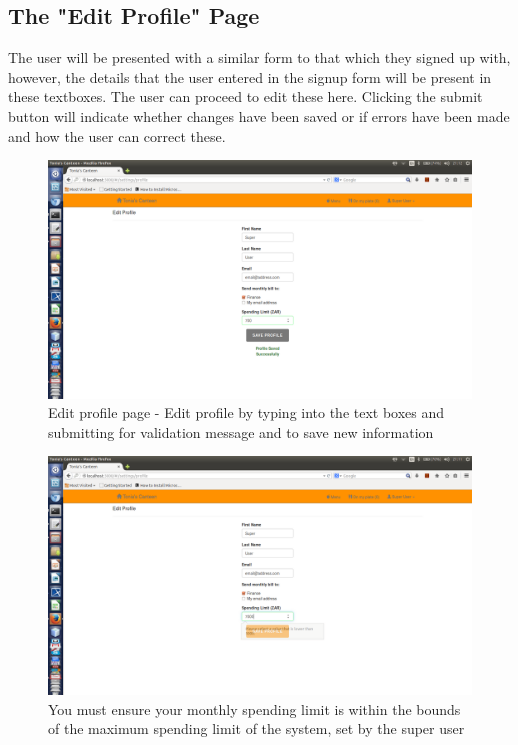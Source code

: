 \documentclass[a4paper,12pt]{report}
\begin{document}
\subsection{The "Edit Profile" Page} 
The user will be presented with a similar form to that which they signed up with, however, the details that the user entered in the signup form will be present in these textboxes. The user can proceed to edit these here. Clicking the submit button will indicate whether changes have been saved or if errors have been made and how the user can correct these.

\begin{figure}[H]
  \centering
    \includegraphics[width=1.0\textwidth]{screenshots/editProfile.png}
    \caption{Edit profile page - Edit profile by typing into the text boxes and submitting for validation message and to save new information } 
\end{figure}

\begin{figure}[H]
  \centering
    \includegraphics[width=1.0\textwidth]{screenshots/limitExeeds.png}
    \caption{You must ensure your monthly spending limit is within the bounds of the maximum spending limit of the system, set by the super user} 
\end{figure}
\end{document}
